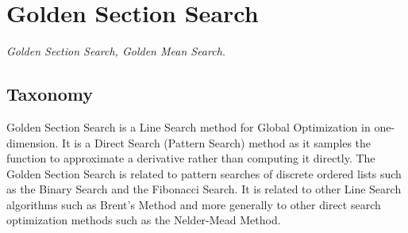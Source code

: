 

\section{Golden Section Search} 
\label{sec:golden_section_search}

\emph{Golden Section Search, Golden Mean Search.}

\subsection{Taxonomy}
Golden Section Search is a Line Search method for Global Optimization in one-dimension. It is a Direct Search (Pattern Search) method as it samples the function to approximate a derivative rather than computing it directly.
The Golden Section Search is related to pattern searches of discrete ordered lists such as the Binary Search and the  Fibonacci Search. It is related to other Line Search algorithms such as Brent's Method and more generally to other direct search optimization methods such as the Nelder-Mead Method.

